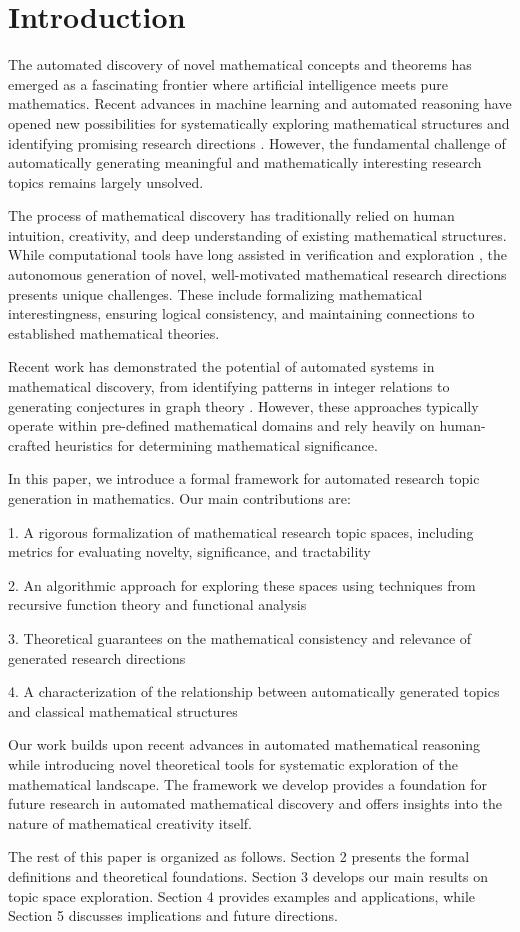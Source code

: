 \section{Introduction}

The automated discovery of novel mathematical concepts and theorems has emerged as a fascinating frontier where artificial intelligence meets pure mathematics. Recent advances in machine learning and automated reasoning have opened new possibilities for systematically exploring mathematical structures and identifying promising research directions \cite{halachmi2024ramanujan, tsoukalas2025learning}. However, the fundamental challenge of automatically generating meaningful and mathematically interesting research topics remains largely unsolved.

The process of mathematical discovery has traditionally relied on human intuition, creativity, and deep understanding of existing mathematical structures. While computational tools have long assisted in verification and exploration \cite{subercaseaux2023automated}, the autonomous generation of novel, well-motivated mathematical research directions presents unique challenges. These include formalizing mathematical interestingness, ensuring logical consistency, and maintaining connections to established mathematical theories.

Recent work has demonstrated the potential of automated systems in mathematical discovery, from identifying patterns in integer relations \cite{halachmi2024ramanujan} to generating conjectures in graph theory \cite{davila2025reverie}. However, these approaches typically operate within pre-defined mathematical domains and rely heavily on human-crafted heuristics for determining mathematical significance.

In this paper, we introduce a formal framework for automated research topic generation in mathematics. Our main contributions are:

1. A rigorous formalization of mathematical research topic spaces, including metrics for evaluating novelty, significance, and tractability

2. An algorithmic approach for exploring these spaces using techniques from recursive function theory and functional analysis

3. Theoretical guarantees on the mathematical consistency and relevance of generated research directions

4. A characterization of the relationship between automatically generated topics and classical mathematical structures

Our work builds upon recent advances in automated mathematical reasoning \cite{georgiev2025mathematical} while introducing novel theoretical tools for systematic exploration of the mathematical landscape. The framework we develop provides a foundation for future research in automated mathematical discovery and offers insights into the nature of mathematical creativity itself.

The rest of this paper is organized as follows. Section 2 presents the formal definitions and theoretical foundations. Section 3 develops our main results on topic space exploration. Section 4 provides examples and applications, while Section 5 discusses implications and future directions.